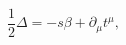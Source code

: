 \begin{equation}
\frac{1}{2}\Delta =-s\beta +\partial _{\mu }t^{\mu },  \label{cin28a}
\end{equation}


